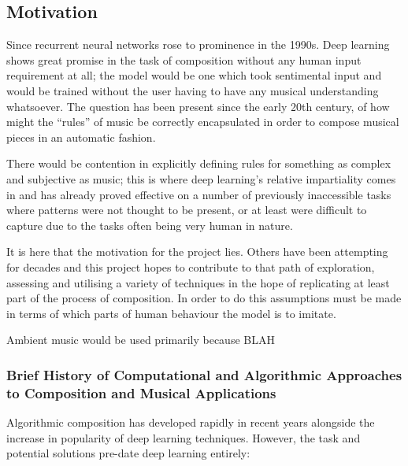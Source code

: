 \documentclass[12pt,]{article}
\begin{document}
\hypertarget{motivation}{%
\subsection{Motivation}\label{motivation}}

Since recurrent neural networks rose to prominence in the 1990s. Deep
learning shows great promise in the task of composition without any
human input requirement at all; the model would be one which took
sentimental input and would be trained without the user having to have
any musical understanding whatsoever. The question has been present
since the early 20th century, of how might the ``rules'' of music be
correctly encapsulated in order to compose musical pieces in an
automatic fashion.

There would be contention in explicitly defining rules for something as
complex and subjective as music; this is where deep learning's relative
impartiality comes in and has already proved effective on a number of
previously inaccessible tasks where patterns were not thought to be
present, or at least were difficult to capture due to the tasks often
being very human in nature.

It is here that the motivation for the project lies. Others have been
attempting for decades and this project hopes to contribute to that path
of exploration, assessing and utilising a variety of techniques in the
hope of replicating at least part of the process of composition. In
order to do this assumptions must be made in terms of which parts of
human behaviour the model is to imitate.

Ambient music would be used primarily because BLAH

\hypertarget{brief-history-of-computational-and-algorithmic-approaches-to-composition-and-musical-applications}{%
\subsubsection{Brief History of Computational and Algorithmic Approaches
to Composition and Musical
Applications}\label{brief-history-of-computational-and-algorithmic-approaches-to-composition-and-musical-applications}}

Algorithmic composition has developed rapidly in recent years alongside
the increase in popularity of deep learning techniques. However, the
task and potential solutions pre-date deep learning entirely:
\end{document}
